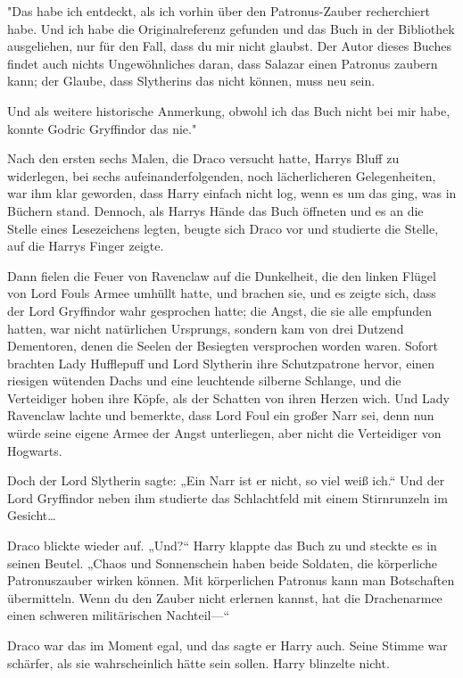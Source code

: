 {"Das habe ich entdeckt, als ich vorhin über den Patronus-Zauber recherchiert habe. Und ich habe die Originalreferenz gefunden und das Buch in der Bibliothek ausgeliehen, nur für den Fall, dass du mir nicht glaubst. Der Autor dieses Buches findet auch nichts Ungewöhnliches daran, dass Salazar einen Patronus zaubern kann; der Glaube, dass Slytherins das nicht können, muss neu sein.

Und als weitere historische Anmerkung, obwohl ich das Buch nicht bei mir habe, konnte Godric Gryffindor das nie."

Nach den ersten sechs Malen, die Draco versucht hatte, Harrys Bluff zu widerlegen, bei sechs aufeinanderfolgenden, noch lächerlicheren Gelegenheiten, war ihm klar geworden, dass Harry einfach nicht log, wenn es um das ging, was in Büchern stand. Dennoch, als Harrys Hände das Buch öffneten und es an die Stelle eines Lesezeichens legten, beugte sich Draco vor und studierte die Stelle, auf die Harrys Finger zeigte.

Dann fielen die Feuer von Ravenclaw auf die Dunkelheit, die den linken Flügel von Lord Fouls Armee umhüllt hatte, und brachen sie, und es zeigte sich, dass der Lord Gryffindor wahr gesprochen hatte; die Angst, die sie alle empfunden hatten, war nicht natürlichen Ursprungs, sondern kam von drei Dutzend Dementoren, denen die Seelen der Besiegten versprochen worden waren. Sofort brachten Lady Hufflepuff und Lord Slytherin ihre Schutzpatrone hervor, einen riesigen wütenden Dachs und eine leuchtende silberne Schlange, und die Verteidiger hoben ihre Köpfe, als der Schatten von ihren Herzen wich. Und Lady Ravenclaw lachte und bemerkte, dass Lord Foul ein großer Narr sei, denn nun würde seine eigene Armee der Angst unterliegen, aber nicht die Verteidiger von Hogwarts.

Doch der Lord Slytherin sagte: „Ein Narr ist er nicht, so viel weiß ich.“ Und der Lord Gryffindor neben ihm studierte das Schlachtfeld mit einem Stirnrunzeln im Gesicht…

Draco blickte wieder auf. „Und?“ Harry klappte das Buch zu und steckte es in seinen Beutel. „Chaos und Sonnenschein haben beide Soldaten, die körperliche Patronuszauber wirken können. Mit körperlichen Patronus kann man Botschaften übermitteln. Wenn du den Zauber nicht erlernen kannst, hat die Drachenarmee einen schweren militärischen Nachteil—“

Draco war das im Moment egal, und das sagte er Harry auch. Seine Stimme war schärfer, als sie wahrscheinlich hätte sein sollen. Harry blinzelte nicht.

}
